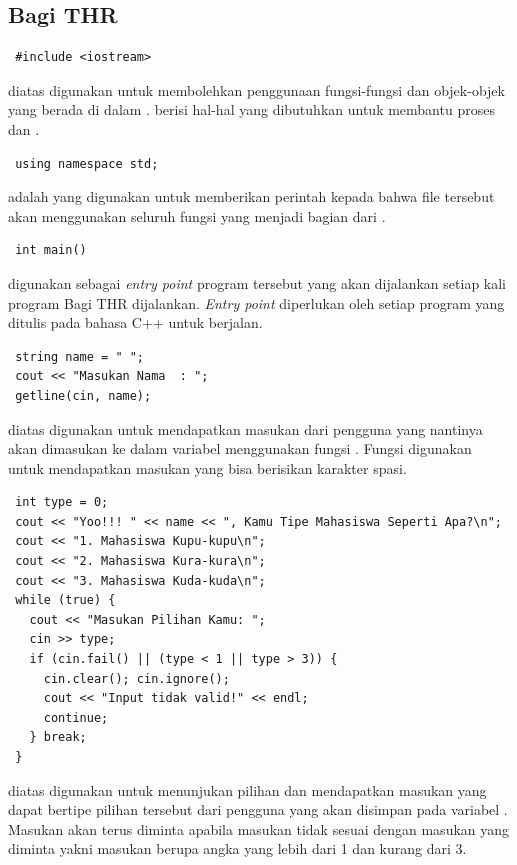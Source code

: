 \documentclass[../main.tex]{subfiles}
\begin{document}
    \subsection{Bagi THR}
\begin{lstlisting}
 #include <iostream>
\end{lstlisting}
    \ilz{}{\Script} diatas digunakan untuk membolehkan penggunaan fungsi-fungsi dan objek-objek yang berada di dalam {\header} {\file} . {\Header} {\file}  berisi hal-hal yang dibutuhkan untuk membantu proses {\ioi} dan {\ioo}.

\begin{lstlisting}
 using namespace std;
\end{lstlisting}
    \ilz{}{\Script}  adalah {\statement} yang digunakan untuk memberikan perintah kepada {\compiler} bahwa file tersebut akan menggunakan seluruh fungsi yang menjadi bagian dari .

\begin{lstlisting}
 int main() 
\end{lstlisting}
\vspace{-0.25ex}
    \ilz{}{\Script} digunakan sebagai \textit{entry point} program tersebut yang akan dijalankan setiap kali program Bagi THR dijalankan. \textit{Entry point} diperlukan oleh setiap program yang ditulis pada bahasa C++ untuk berjalan.

\begin{lstlisting}
 string name = " ";
 cout << "Masukan Nama  : ";
 getline(cin, name);
\end{lstlisting}
\vspace{-0.25ex}
    \ilz{}{\Script} diatas digunakan untuk mendapatkan masukan dari pengguna yang nantinya akan dimasukan ke dalam variabel  menggunakan fungsi . Fungsi  digunakan untuk mendapatkan masukan yang bisa berisikan karakter spasi.

\begin{lstlisting}
 int type = 0;
 cout << "Yoo!!! " << name << ", Kamu Tipe Mahasiswa Seperti Apa?\n";
 cout << "1. Mahasiswa Kupu-kupu\n";
 cout << "2. Mahasiswa Kura-kura\n";
 cout << "3. Mahasiswa Kuda-kuda\n";
 while (true) {
   cout << "Masukan Pilihan Kamu: ";
   cin >> type;
   if (cin.fail() || (type < 1 || type > 3)) {
     cin.clear(); cin.ignore();
     cout << "Input tidak valid!" << endl;
     continue;
   } break;
 }
\end{lstlisting}
\vspace{-0.25ex}
    \ilz{}{\Script} diatas digunakan untuk menunjukan pilihan dan mendapatkan masukan yang dapat bertipe pilihan tersebut dari pengguna yang akan disimpan pada variabel . Masukan akan terus diminta apabila masukan tidak sesuai dengan masukan yang diminta yakni masukan berupa angka yang lebih dari 1 dan kurang dari 3.
\end{document}
